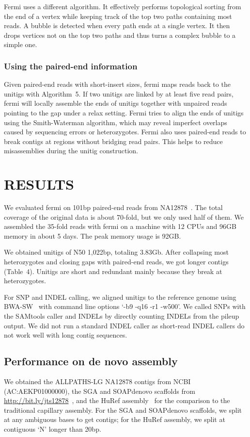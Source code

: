 \documentclass{bioinfo}
\begin{document}
\begin{methods}
Fermi uses a different algorithm. It effectively performs topological sorting
from the end of a vertex while keeping track of the top two paths containing
most reads. A bubble is detected when every path ends at a single vertex. It
then drops vertices not on the top two paths and thus turns a complex bubble to
a simple one.

\subsubsection{Using the paired-end information}
Given paired-end reads with short-insert sizes, fermi maps reads back to the
unitigs with Algorithm~5. If two unitigs are linked by at least five read
pairs, fermi will locally assemble the ends of unitigs together with unpaired
reads pointing to the gap under a relax setting. Fermi tries to align the
ends of unitigs using the Smith-Waterman algorithm, which may reveal imperfect
overlaps caused by sequencing errors or heterozygotes. Fermi also uses
paired-end reads to break contigs at regions without bridging read pairs. This
helps to reduce misassemblies during the unitig construction.
\end{methods}

\section{RESULTS}

We evaluated fermi on 101bp paired-end reads from NA12878~\citep{Depristo:2011vn}.
The total coverage of the original data is about 70-fold, but we only used half
of them. We assembled the 35-fold reads with fermi on a machine with 12 CPUs
and 96GB memory in about 5 days. The peak memory usage is 92GB.

We obtained unitigs of N50 1,022bp, totaling 3.83Gb. After collapsing
most heterozygotes and closing gaps with paired-end reads, we got longer contigs
(Table~4). Unitigs are short and redundant mainly because they break at
heterozygotes.

For SNP and INDEL calling, we aligned unitigs to the reference genome using
BWA-SW~\citep{Li:2010fk} with command line options `-b9 -q16 -r1 -w500'. We
called SNPs with the SAMtools caller and INDELs by directly counting INDELs
from the pileup output. We did not run a standard INDEL caller as short-read
INDEL callers do not work well with long contig sequences.

\subsection{Performance on de novo assembly}
We obtained the ALLPATHS-LG NA12878 contigs from NCBI (AC:AEKP01000000), the
SGA and SOAPdenovo scaffolds from
\mbox{\href{http://bit.ly/jts12878}{http://bit.ly/jts12878}}~\citep{Simpson:2011ly}, and the HuRef
assembly~\citep{Levy:2007uq} for
the comparison to the traditional capillary assembly. For the SGA and
SOAPdenovo scaffolds, we split at any ambiguous bases to get contigs; for the
HuRef assembly, we split at contiguous `N' longer than 20bp.
\end{document}

